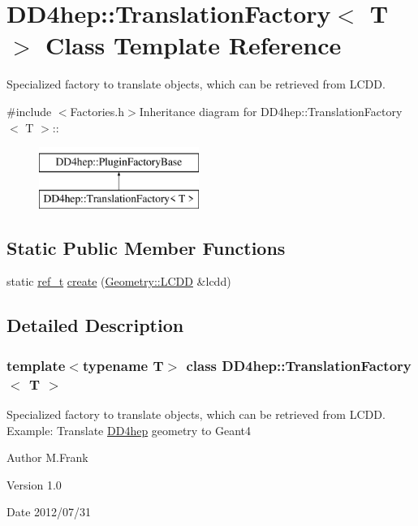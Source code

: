 \hypertarget{class_d_d4hep_1_1_translation_factory}{
\section{DD4hep::TranslationFactory$<$ T $>$ Class Template Reference}
\label{class_d_d4hep_1_1_translation_factory}
}


Specialized factory to translate objects, which can be retrieved from LCDD.  


{\ttfamily \#include $<$Factories.h$>$}Inheritance diagram for DD4hep::TranslationFactory$<$ T $>$::\begin{figure}[H]
\begin{center}
\leavevmode
\includegraphics[height=2cm]{class_d_d4hep_1_1_translation_factory}
\end{center}
\end{figure}
\subsection*{Static Public Member Functions}
\begin{DoxyCompactItemize}
\item 
static \hyperlink{class_d_d4hep_1_1_handle}{ref\_\-t} \hyperlink{class_d_d4hep_1_1_translation_factory_a9a32f69ddecbefc80fbeeb1c4a22624b}{create} (\hyperlink{class_d_d4hep_1_1_geometry_1_1_l_c_d_d}{Geometry::LCDD} \&lcdd)
\end{DoxyCompactItemize}


\subsection{Detailed Description}
\subsubsection*{template$<$typename T$>$ class DD4hep::TranslationFactory$<$ T $>$}

Specialized factory to translate objects, which can be retrieved from LCDD. Example: Translate \hyperlink{namespace_d_d4hep}{DD4hep} geometry to Geant4

\begin{DoxyAuthor}{Author}
M.Frank 
\end{DoxyAuthor}
\begin{DoxyVersion}{Version}
1.0 
\end{DoxyVersion}
\begin{DoxyDate}{Date}
2012/07/31 
\end{DoxyDate}


